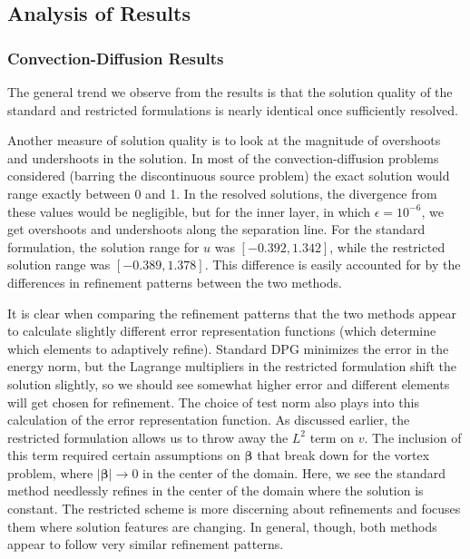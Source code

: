 \documentclass[letterpaper]{article}
\def\bbeta{\boldsymbol\beta}
\newcommand{\snorm}[1]{\left| #1 \right|}
\begin{document}
\subsection{Analysis of Results}\label{sec:problemAnalysis}
\subsubsection{Convection-Diffusion Results}
The general trend we observe from the results is that the solution quality
of the standard and restricted formulations is nearly identical once
sufficiently resolved.

Another measure of solution quality is to look at the magnitude of overshoots
and undershoots in the solution. In most of the convection-diffusion problems considered (barring
the discontinuous source problem) the exact solution would range exactly
between 0 and 1. In the resolved solutions, the divergence from these values
would be negligible, but for the inner layer, in which $\epsilon=10^{-6}$, we
get overshoots and undershoots along the separation line. For the
standard formulation, the solution range for $u$ was $[-0.392,1.342]$,
while the restricted solution range was $[-0.389,1.378]$. This difference is
easily accounted for by the differences in refinement patterns between the two
methods.

It is clear when comparing the refinement patterns that the two methods appear
to calculate slightly different error representation functions (which
determine which elements to adaptively refine). Standard DPG minimizes the
error in the energy norm, but the Lagrange multipliers in the restricted
formulation shift the solution slightly, so we should see somewhat higher
error and different elements will get chosen for refinement. The choice of
test norm also plays into this calculation of the error representation
function. As discussed earlier, the restricted formulation allows us to
throw away the $L^2$ term on $v$. The inclusion of this term required certain
assumptions on $\bbeta$ \cite{ChanHeuerThanhDemkowicz2012} that break down for
the vortex problem, where $\snorm{\bbeta}\rightarrow 0$ in the center of the domain. 
Here, we see the standard method needlessly refines
in the center of the domain where the solution is constant. The restricted
scheme is more discerning about refinements and focuses them where
solution features are changing. In general, though, both methods appear to
follow very similar refinement patterns.
\end{document}
